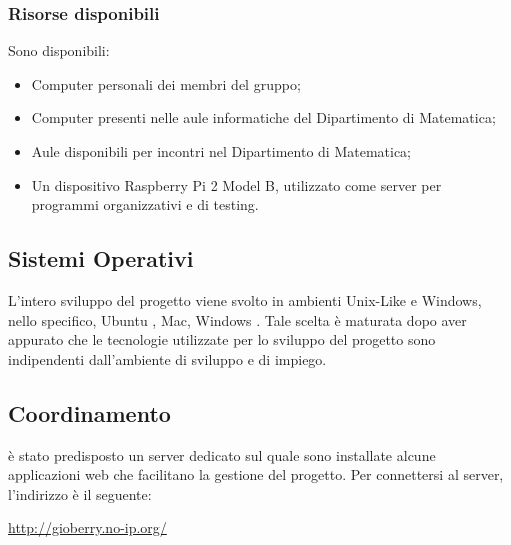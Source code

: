 {\subsubsection{Risorse disponibili}{
	Sono disponibili:
	\begin{itemize}
		\item Computer personali dei membri del gruppo;
		\item Computer presenti nelle aule informatiche del Dipartimento di Matematica;
		\item Aule disponibili per incontri nel Dipartimento di Matematica;
		\item Un dispositivo Raspberry Pi 2 Model B, utilizzato come server per programmi organizzativi e di testing.
	\end{itemize}
}
}

\subsection{Sistemi Operativi}

L’intero sviluppo del progetto viene svolto in ambienti Unix-Like e Windows, nello specifico, Ubuntu , Mac, Windows . Tale scelta è maturata dopo aver appurato che le tecnologie utilizzate per lo sviluppo del progetto sono indipendenti dall’ambiente di sviluppo e di impiego.

\subsection{Coordinamento}
\label{sec:strumentiCoordinamento}
è stato predisposto un server dedicato sul quale sono installate alcune applicazioni web
che facilitano la gestione del progetto. Per connettersi al server, l'indirizzo è il seguente:\\
\begin{center}
\url{http://gioberry.no-ip.org/}
\end{center}
